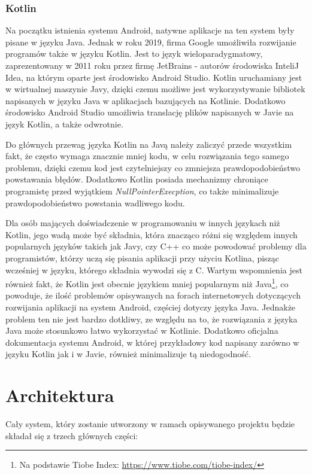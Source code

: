 \documentclass[a4paper,12pt,twoside,openany]{report}
\begin{document}
\subsection{Kotlin}
Na początku istnienia systemu Android, natywne aplikacje na ten system były pisane w języku Java. Jednak w roku 2019, firma Google umożliwiła rozwijanie programów także w języku Kotlin. Jest to język wieloparadygmatowy, zaprezentowany w 2011 roku przez firmę JetBrains - autorów środowiska InteliJ Idea, na którym oparte jest środowisko Android Studio. Kotlin uruchamiany jest w wirtualnej maszynie Javy, dzięki czemu możliwe jest wykorzystywanie bibliotek napisanych w języku Java w aplikacjach bazujących na Kotlinie. Dodatkowo środowisko Android Studio umożliwia translację plików napisanych w Javie na język Kotlin, a także odwrotnie. 

Do głównych przewag języka Kotlin na Javą należy zaliczyć przede wszystkim fakt, że często wymaga znacznie mniej kodu, w celu rozwiązania tego samego problemu, dzięki czemu kod jest czytelniejszy co zmniejsza prawdopodobieństwo powstawania błędów. Dodatkowo Kotlin posiada mechanizmy chroniące programistę przed wyjątkiem \textit{NullPointerExecption}, co także minimalizuje prawdopodobieństwo powstania wadliwego kodu. 

Dla osób mających doświadczenie w programowaniu w innych językach niż Kotlin, jego wadą może być składnia, która znacząco różni się względem innych popularnych języków takich jak Javy, czy C++ co może powodować problemy dla programistów, którzy uczą się pisania aplikacji przy użyciu  Kotlina, pisząc wcześniej w języku, którego składnia wywodzi się z C. Wartym wspomnienia jest również fakt, że Kotlin jest obecnie językiem mniej popularnym niż Java\footnote{Na podstawie Tiobe Index: \url{ https://www.tiobe.com/tiobe-index/}}, co powoduje, że ilość problemów opisywanych na forach internetowych dotyczących rozwijania aplikacji na system Android, częściej dotyczy języka Java. Jednakże problem ten nie jest bardzo dotkliwy, ze względu na to, że rozwiązania z języka Java może stosunkowo łatwo wykorzystać w Kotlinie. Dodatkowo oficjalna dokumentacja systemu Android, w której przykładowy kod napisany zarówno w języku Kotlin jak i w Javie, również minimalizuje tą niedogodność. 

\chapter{Architektura}
Cały system, który zostanie utworzony w ramach opisywanego projektu będzie składał się z trzech głównych części: 
\end{document}
